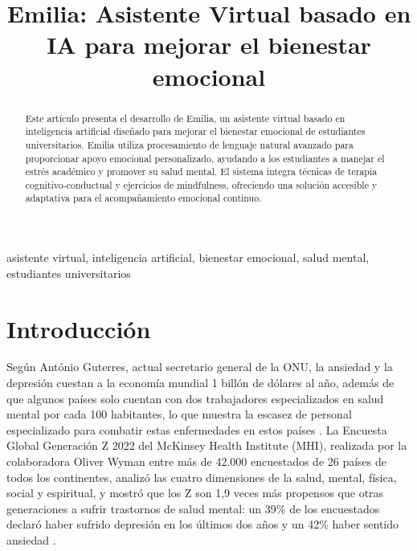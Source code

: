\documentclass[conference]{IEEEtran}
\begin{document}
\title{Emilia: Asistente Virtual basado en IA para mejorar el bienestar emocional}

\author{
}

\maketitle

\begin{abstract}
Este artículo presenta el desarrollo de Emilia, un asistente virtual basado en inteligencia artificial diseñado para mejorar el bienestar emocional de estudiantes universitarios. Emilia utiliza procesamiento de lenguaje natural avanzado para proporcionar apoyo emocional personalizado, ayudando a los estudiantes a manejar el estrés académico y promover su salud mental. El sistema integra técnicas de terapia cognitivo-conductual y ejercicios de mindfulness, ofreciendo una solución accesible y adaptativa para el acompañamiento emocional continuo.
\end{abstract}

\begin{IEEEkeywords}
asistente virtual, inteligencia artificial, bienestar emocional, salud mental, estudiantes universitarios
\end{IEEEkeywords}

\section{Introducción}
Según António Guterres, actual secretario general de la ONU, la ansiedad y la depresión cuestan a la economía mundial 1 billón de dólares al año, además de que algunos países solo cuentan con dos trabajadores especializados en salud mental por cada 100 habitantes, lo que muestra la escasez de personal especializado para combatir estas enfermedades en estos países \cite{b1}. La Encuesta Global Generación Z 2022 del McKinsey Health Institute (MHI), realizada por la colaboradora Oliver Wyman entre más de 42.000 encuestados de 26 países de todos los continentes, analizó las cuatro dimensiones de la salud, mental, física, social y espiritual, y mostró que los Z son 1,9 veces más propensos que otras generaciones a sufrir trastornos de salud mental: un 39\% de los encuestados declaró haber sufrido depresión en los últimos dos años y un 42\% haber sentido ansiedad \cite{b2}.
\end{document}
